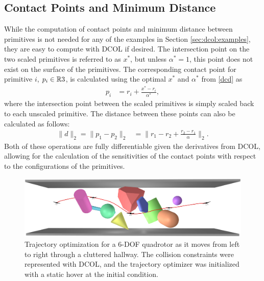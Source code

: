 \subsection{Contact Points and Minimum Distance}
While the computation of contact points and minimum distance between primitives is not needed for any of the examples in Section \ref{sec:dcol:examples}, they are easy to compute with DCOL if desired. The intersection point on the two scaled primitives is referred to as $x^*$, but unless $\alpha^*=1$, this point does not exist on the surface of the primitives. The corresponding contact point for primitive $i$, $p_i \in \mathbb{R}{3}$, is calculated using the optimal $x^*$ and $\alpha^*$ from \eqref{dcd} as
\begin{align}
    p_i &= r_i + \frac{x^* - r_i}{\alpha^*},
\end{align}
where the intersection point between the scaled primitives is simply scaled back to each unscaled primitive. The distance between these points can also be calculated as follows:
\begin{align}
    \|d\|_2 = \|p_1 - p_2\|_2 &= \|r_1 - r_2 + \frac{r_2 - r_1}{\alpha}\|_2.
\end{align}
Both of these operations are fully differentiable given the derivatives from DCOL, allowing for the calculation of the sensitivities of the contact points with respect to the configurations of the primitives. 
\begin{figure}[t!]
    \centering
    \includegraphics[width=.9\textwidth]{figures/hallway_v5.png}
    \caption{Trajectory optimization for a 6-DOF quadrotor as it moves from left to right through a cluttered hallway. The collision constraints were represented with DCOL, and the trajectory optimizer was initialized with a static hover at the initial condition.}
    \label{fig:hallway}
\end{figure}
